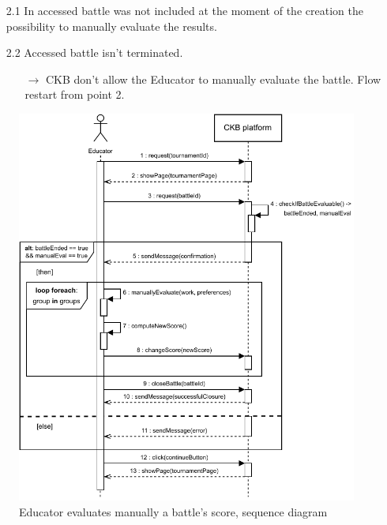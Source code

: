\documentclass{article}
\begin{document}
{\begin{enumerate}
\begin{xltabular}{\textwidth}
\begin{itemize}
                  \item[2.1] In accessed battle was not included at the moment of the creation
                        the possibility to manually evaluate the results.
                  \item[2.2] Accessed battle isn't terminated.
                        \begin{itemize}
                            \item[$\rightarrow$] CKB don't allow the Educator to manually evaluate
                                  the battle. Flow restart from point 2.
                        \end{itemize}
              \end{itemize}
          \end{xltabular}

          \begin{figure}[H]
              \centering
              \includegraphics[scale=0.95]{images/SequenceDiagrams/Sequence8.pdf}
              \caption{Educator evaluates manually a battle's score, sequence diagram}
              \label{fig:BattleEvalSeqDiagram}
          \end{figure}


\end{enumerate}}
\end{document}
